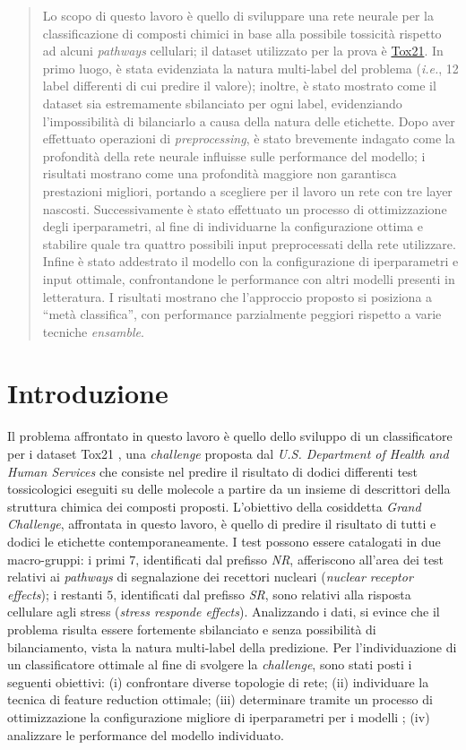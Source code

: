 \begin{abstract}
Lo scopo di questo lavoro è quello di sviluppare una rete neurale per la classificazione di composti chimici in base alla possibile tossicità rispetto ad alcuni \textit{pathways} cellulari; il dataset utilizzato per la prova è \href{http://bioinf.jku.at/research/DeepTox/tox21.html}{Tox21}.
In primo luogo, è stata evidenziata la natura multi-label del problema (\textit{i.e.}, 12 label differenti di cui predire il valore); inoltre, è stato mostrato come il dataset sia estremamente sbilanciato per ogni label, evidenziando l'impossibilità di bilanciarlo a causa della natura delle etichette.
Dopo aver effettuato operazioni di \textit{preprocessing}, è stato brevemente indagato come la profondità della rete neurale influisse sulle performance del modello; i risultati mostrano come una profondità maggiore non garantisca prestazioni migliori, portando a scegliere per il lavoro un rete con tre layer nascosti.
Successivamente è stato effettuato un processo di ottimizzazione degli iperparametri, al fine di individuarne la configurazione ottima e stabilire quale tra quattro possibili input preprocessati della rete utilizzare.
Infine è stato addestrato il modello con la configurazione di iperparametri e input ottimale, confrontandone le performance con altri modelli presenti in letteratura.
I risultati mostrano che l'approccio proposto si posiziona a “metà classifica”, con performance parzialmente peggiori rispetto a varie tecniche \textit{ensamble}.
\end{abstract}

\section{Introduzione}
Il problema affrontato in questo lavoro è quello dello sviluppo di un classificatore per i dataset Tox21 \cite{challenge_site}, una \textit{challenge} proposta dal \textit{U.S. Department of Health and Human Services} che consiste nel predire il risultato di dodici differenti test tossicologici eseguiti su delle molecole a partire da un insieme di descrittori della struttura chimica dei composti proposti.
L'obiettivo della cosiddetta \textit{Grand Challenge}, affrontata in questo lavoro, è quello di predire il risultato di tutti e dodici le etichette contemporaneamente. I test possono essere catalogati in due macro-gruppi: i primi $7$, identificati dal prefisso \textit{NR}, afferiscono all'area dei test relativi ai \textit{pathways} di segnalazione dei recettori nucleari (\textit{nuclear receptor effects}); i restanti $5$, identificati dal prefisso \textit{SR}, sono relativi alla risposta cellulare agli stress (\textit{stress responde effects}).
Analizzando i dati, si evince che il problema risulta essere fortemente sbilanciato e senza possibilità di bilanciamento, vista la natura multi-label della predizione.
Per l'individuazione di un classificatore ottimale al fine di svolgere la \textit{challenge}, sono stati posti i seguenti obiettivi: (i) confrontare diverse topologie di rete; (ii) individuare la tecnica di feature reduction ottimale; (iii) determinare tramite un processo di ottimizzazione la configurazione migliore di iperparametri per i modelli ; (iv) analizzare le performance del modello individuato.
